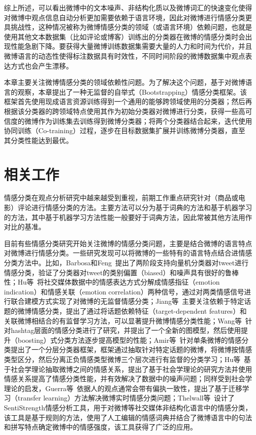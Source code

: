 综上所述，可以看出微博中的文本噪声、非结构化质以及微博词汇的快速变化使得对微博中观点信息自动分析更加需要依赖于语言环境，因此对微博进行情感分类更具挑战性，这种情况被称为微博情感分类的领域（或语言环境）依赖问题，也就是使用其他文本数据集（比如评论或博客）训练出的分类器在微博的情感分类时会出现性能急剧下降。要获得大量微博训练数据集需要大量的人力和时间为代价，并且微博语言的动态性使得标注数据具有时效性，不同时间阶段的微博数据集中观点表达方式也会产生漂移。

本章主要关注微博情感分类的领域依赖性问题。为了解决这个问题，基于对微博语言的观察，本章提出了一种无监督的自举式（Bootstrapping）情感分类框架。该框架首先使用现成语言资源训练得到一个通用的能够跨领域使用的分类器；然后再根据该分类器的跨领域特点使用其作为初始分类器对微博进行分类，获得一些高可信度的微博作为训练集去训练得到微博分类器；将两个分类器结合起来，迭代使用协同训练（Co-training）过程，逐步在目标数据集扩展并训练微博分类器，直至其分类性能达到最优。

\section{相关工作}
\label{ch4_relt}
情感分类在观点分析研究中越来越受到重视，前期工作重点研究针对（商品或电影）评论进行情感分类的方法。主要方法可以分为基于词典的方法和基于机器学习的方法，其中基于机器学习方法性能一般要好于词典方法，因此常被其他方法用作对比的基准。

目前有些情感分类研究开始关注微博的情感分类问题，主要是结合微博的语言特点对微博进行情感分类。一些研究发现可以将微博的一些特有的语言特点结合进情感分类方法中。比如，Barbosa和Feng~提出了两阶段支持向量机分类器对tweet进行情感分类，验证了分类器对tweet的类别偏置（biased）和噪声具有很好的鲁棒性；Hu等~将社交媒体数据中的情感表达方式分解成情感指征（emotion indication）和情感关联（emotion correlation）两种信号，通过对两类情感信号进行联合建模方式实现了对微博的无监督情感分类；Jiang等~主要关注依赖于特定话题的微博情感分类，提出了通过将话题依赖特征（target-dependent features）和关联微博相结合的有监督学习方法，可以显著提升微博情感分类性能；Wang等~针对hashtag层面的情感分类进行了研究，并提出了一个全新的图模型，然后使用提升（boosting）式分类方法逐步提高模型的性能；Amir等~针对单条微博的情感分类提出了一个分层分类器框架，框架通过抽取针对特定话题的微博，将微博按情感类型区分，然后分离正负情感类型微博三个层次进行有监督的分类学习；Hu等~基于社会学理论抽取微博之间的情感关系，提出了基于社会学理论的研究方法并使用情感关系提高了情感分类性能，并有效解决了数据中的噪声问题；同样受到社会学理论的启发，Guerra等~依据人的观点通常会带有偏执一致性，提出了基于迁移学习（transfer learning）方法解决微博实时情感分类问题；Thelwall等~设计了SentiStrength情感分析工具，用于对微博等社交媒体非结构化语言中的情感分类，该工具是基于规则的方法，使用了人工编辑的情感词典并结合了微博语言中的句法和拼写特点确定微博中的情感强度，该工具获得了广泛的应用。

